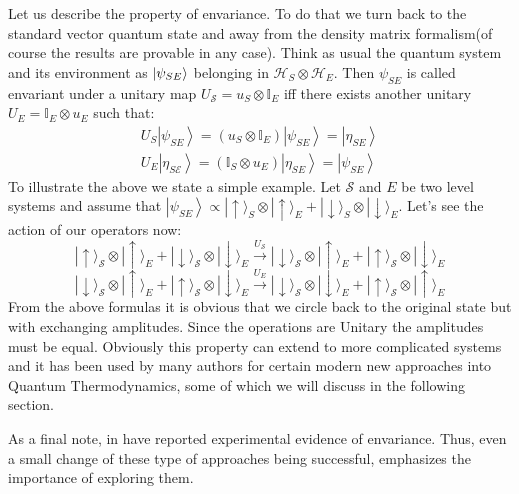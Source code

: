 \documentclass[a4paper,12pt]{article}
\begin{document}
\par
Let us describe the property of envariance. To do that we turn back to the standard vector quantum state and away from the density matrix formalism(of course the results are provable in any case). Think as usual the quantum system and its environment
as $\ket{\psi_{SE}}$ belonging in
$\mathcal{H}_S \otimes \mathcal{H}_E$. Then $\psi_{SE}$ is called envariant under a unitary map $U_{\mathcal{S}}=u_{S} \otimes \mathbb{I}_{E}$ iff there exists another unitary $U_{E}= \mathbb{I}_{E} \otimes u_{E} $ such that:
\begin{equation}
\begin{array}{l}
U_{S}\left|\psi_{S E}\right\rangle=\left(u_{S} \otimes \mathbb{I}_{E}\right)\left|\psi_{S E}\right\rangle=\left|\eta_{S E}\right\rangle \\
U_{E}\left|\eta_{S \mathcal{E}}\right\rangle=\left(\mathbb{I}_{S} \otimes u_{E}\right)\left|\eta_{S E}\right\rangle=\left|\psi_{S E}\right\rangle
\end{array}
\end{equation}
To illustrate the above we state a simple example. Let $\mathcal{S}$ and $E$ be two level systems and assume that $\left|\psi_{SE}\right\rangle \propto|\uparrow\rangle_{S} \otimes|\uparrow\rangle_{E}+|\downarrow\rangle_{S} \otimes|\downarrow\rangle_{E}$. Let's see the action of our operators now:
\begin{equation}
|\uparrow\rangle_{\mathcal{S}} \otimes|\uparrow\rangle_{E}+|\downarrow\rangle_{\mathcal{S}} \otimes|\downarrow\rangle_{E} \stackrel{U_{\mathcal{S}}}{\longrightarrow}|\downarrow\rangle_{\mathcal{S}} \otimes|\uparrow\rangle_{E}+|\uparrow\rangle_{\mathcal{S}} \otimes|\downarrow\rangle_{E}
\end{equation}
\begin{equation}
|\downarrow\rangle_{\mathcal{S}} \otimes|\uparrow\rangle_{E}+|\uparrow\rangle_{\mathcal{S}} \otimes|\downarrow\rangle_{E} \stackrel{U_{E}}{\longrightarrow}|\downarrow\rangle_{\mathcal{S}} \otimes|\downarrow\rangle_{E}+|\uparrow\rangle_{\mathcal{S}} \otimes|\uparrow\rangle_{E}
\end{equation}
From the above formulas it is obvious that we circle back to the original state but with exchanging amplitudes. Since the operations are Unitary the amplitudes must be equal. Obviously this property can extend to more complicated systems and it has been used by many authors for certain modern new approaches into Quantum Thermodynamics, some of which we will discuss in the following section. 
\par As a final note, in \cite{vermeyden2015experimental} have reported experimental evidence of envariance. Thus, even a small change of these type of approaches being successful, emphasizes the importance of exploring them.
\end{document}
